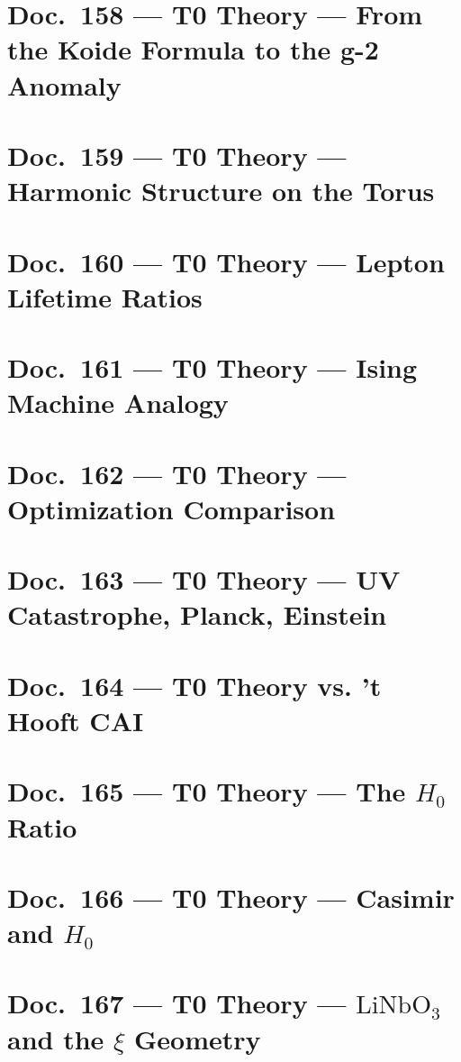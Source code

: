 	\chapter{Doc.~158 --- T0 Theory — From the Koide Formula to the g-2 Anomaly}
	
	\chapter{Doc.~159 --- T0 Theory — Harmonic Structure on the Torus}
	
	\chapter{Doc.~160 --- T0 Theory — Lepton Lifetime Ratios}
	
	\chapter{Doc.~161 --- T0 Theory — Ising Machine Analogy}
	
	\chapter{Doc.~162 --- T0 Theory — Optimization Comparison}
	
	\chapter{Doc.~163 --- T0 Theory — UV Catastrophe, Planck, Einstein}
	
	\chapter{Doc.~164 --- T0 Theory vs. 't Hooft CAI}
	
	\chapter{Doc.~165 --- T0 Theory — The $H_0$ Ratio}
	
	\chapter{Doc.~166 --- T0 Theory — Casimir and $H_0$}
	
	\chapter{Doc.~167 --- T0 Theory — $\mathrm{LiNbO}_3$ and the $\xi$ Geometry}
	
